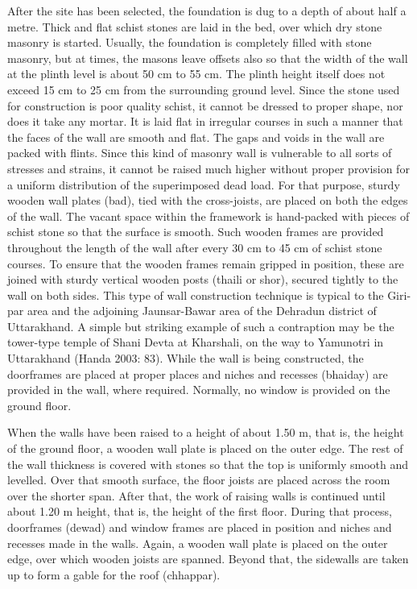 After the site has been selected, the foundation is dug to a depth of about half a metre. Thick and flat schist stones are laid in the bed, over which dry stone masonry is started. Usually, the foundation is completely filled with stone masonry, but at times, the masons leave offsets also so that the width of the wall at the plinth level is about 50 cm to 55 cm. The plinth height itself does not exceed 15 cm to 25 cm from the surrounding ground level. Since the stone used for construction is poor quality schist, it cannot be dressed to proper shape, nor does it take any mortar. It is laid flat in irregular courses in such a manner that the faces of the wall are smooth and flat. The gaps and voids in the wall are packed with flints. Since this kind of masonry wall is vulnerable to all sorts of stresses and strains, it cannot be raised much higher without proper provision for a uniform distribution of the superimposed dead load. For that purpose, sturdy wooden wall plates (bad), tied with the cross-joists, are placed on both the edges of the wall. The vacant space within the framework is hand-packed with pieces of schist stone so that the surface is smooth. Such wooden frames are provided throughout the length of the wall after every 30 cm to 45 cm of schist stone courses. To ensure that the wooden frames remain gripped in position, these are joined with sturdy vertical wooden posts (thaili or shor), secured tightly to the wall on both sides. This type of wall construction technique is typical to the Giri-par area and the adjoining Jaunsar-Bawar area of the Dehradun district of Uttarakhand. A simple but striking example of such a contraption may be the tower-type temple of Shani Devta at Kharshali, on the way to Yamunotri in Uttarakhand (Handa 2003: 83). While the wall is being constructed, the doorframes are placed at proper places and niches and recesses (bhaiday) are provided in the wall, where required. Normally, no window is provided on the ground floor.

When the walls have been raised to a height of about 1.50 m, that is, the height of the ground floor, a wooden wall plate is placed on the outer edge. The rest of the wall thickness is covered with stones so that the top is uniformly smooth and levelled. Over that smooth surface, the floor joists are placed across the room over the shorter span. After that, the work of raising walls is continued until about 1.20 m height, that is, the height of the first floor. During that process, doorframes (dewad) and window frames are placed in position and niches and recesses made in the walls. Again, a wooden wall plate is placed on the outer edge, over which wooden joists are spanned. Beyond that, the sidewalls are taken up to form a gable for the roof (chhappar).

